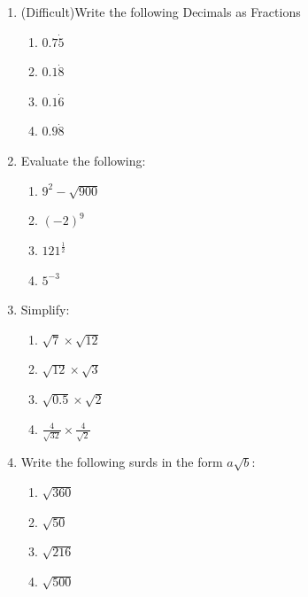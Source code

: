 \documentclass[a4paper,12pt]{article}
\begin{document}
\begin{enumerate}
\begin{multicols}{4}
\begin{enumerate}
			\item $\displaystyle 0.\dot{4}\dot{1}$
			\item $\displaystyle 0.\dot{8}\dot{1}$
		\end{enumerate}
	\end{multicols}
	\item (Difficult)Write the following Decimals as Fractions
	\begin{multicols}{4}
		\begin{enumerate}
			\item $\displaystyle 0.7\dot{5}$
			\item $\displaystyle 0.1\dot{8}$
			\item $\displaystyle 0.1\dot{6}$
			\item $\displaystyle 0.9\dot{8}$
		\end{enumerate}
	\end{multicols}
	\item Evaluate the following:
	\begin{multicols}{4}
		\begin{enumerate}
			\item $\displaystyle 9^{2}-\sqrt{900}$
			\item $\displaystyle (-2)^{9}$
			\item $\displaystyle 121^{\frac{1}{2}}$
			\item $\displaystyle 5^{-3}$
		\end{enumerate}
	\end{multicols}
	\item Simplify:
	\begin{multicols}{4}
		\begin{enumerate}
			\item $\displaystyle \sqrt{7}\times \sqrt{12}$
			\item $\displaystyle \sqrt{12}\times \sqrt{3}$
			\item $\displaystyle \sqrt{0.5}\times \sqrt{2}$
			\item $\displaystyle \frac{4}{\sqrt{32}}\times \frac{4}{\sqrt{2}}$
		\end{enumerate}
	\end{multicols}
	\item Write the following surds in the form $\displaystyle a\sqrt{b}$:
	\begin{multicols}{4}
		\begin{enumerate}
			\item $\displaystyle  \sqrt{360}$
			\item $\displaystyle \sqrt{50}$
			\item $\displaystyle \sqrt{216}$
			\item $\displaystyle \sqrt{500}$
		\end{enumerate}
	\end{multicols}
\end{enumerate}
\newpage
\end{document}
